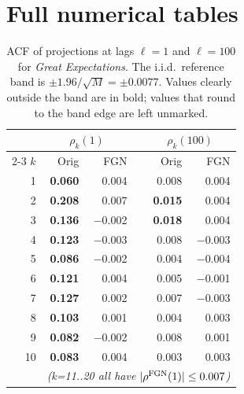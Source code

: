 \documentclass[preprint]{elsarticle}
\begin{document}
\section{Full numerical tables}
\begin{table}[H]
\centering
\caption{ACF of projections at lags $\ell = 1$ and $\ell = 100$ for
\emph{Great Expectations}. The i.i.d.\ reference band is
$\pm 1.96/\sqrt{M} = \pm 0.0077$. Values clearly outside the band are
in bold; values that round to the band edge are left unmarked.}
\label{tab:acf_summary}
\small
\begin{tabular}{r rr r rr}
\toprule
 & \multicolumn{2}{c}{$\rho_k(1)$} & \phantom{x}
 & \multicolumn{2}{c}{$\rho_k(100)$} \\
\cmidrule{2-3} \cmidrule{5-6}
$k$ & Orig & FGN && Orig & FGN \\
\midrule
 1 & \textbf{0.060} &    0.004 &&    0.008 &    0.004 \\
 2 & \textbf{0.208} &    0.007 && \textbf{0.015} &    0.004 \\
 3 & \textbf{0.136} & $-$0.002 && \textbf{0.018} &    0.004 \\
 4 & \textbf{0.123} & $-$0.003 &&    0.008 & $-$0.003 \\
 5 & \textbf{0.086} & $-$0.002 &&    0.004 & $-$0.004 \\
 6 & \textbf{0.121} &    0.004 &&    0.005 & $-$0.001 \\
 7 & \textbf{0.127} &    0.002 &&    0.007 & $-$0.003 \\
 8 & \textbf{0.103} &    0.001 &&    0.004 &    0.003 \\
 9 & \textbf{0.082} & $-$0.002 &&    0.008 &    0.001 \\
10 & \textbf{0.083} &    0.004 &&    0.003 &    0.003 \\
\midrule
 & \multicolumn{5}{l}{\emph{(k=11..20 all have $|\rho^{\rm FGN}(1)| \le 0.007$)}} \\
\bottomrule
\end{tabular}
\end{table}
\end{document}
